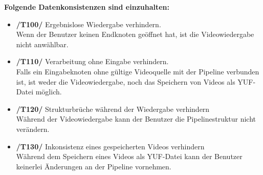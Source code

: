 \newpage

\textbf{Folgende Datenkonsistenzen sind einzuhalten:}
\begin{itemize}
	\item\textbf{/T100/} Ergebnislose Wiedergabe verhindern. ~\\
		Wenn der Benutzer keinen Endknoten geöffnet hat, ist die Videowiedergabe nicht anwählbar.
	\item\textbf{/T110/} Verarbeitung ohne Eingabe verhindern. ~\\
		Falls ein Eingabeknoten ohne gültige Videoquelle mit der Pipeline verbunden ist, ist weder die Videowiedergabe, noch das Speichern von Videos als YUF-Datei möglich.
	\item\textbf{/T120/} Strukturbrüche während der Wiedergabe verhindern ~\\
		Während der Videowiedergabe kann der Benutzer die Pipelinestruktur nicht verändern.
	\item\textbf{/T130/} Inkonsistenz eines gespeicherten Videos verhindern ~\\
		Während dem Speichern eines Videos als YUF-Datei kann der Benutzer keinerlei Änderungen an der Pipeline vornehmen.
\end{itemize}

